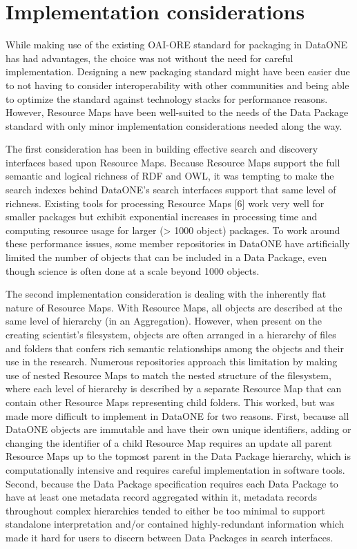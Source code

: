 \documentclass[conference]{IEEEtran}
\begin{document}
\section{Implementation considerations}

While making use of the existing OAI-ORE standard for packaging in DataONE has had advantages, the choice was not without the need for careful implementation. Designing a new packaging standard might have been easier due to not having to consider interoperability with other communities and being able to optimize the standard against technology stacks for performance reasons. However, Resource Maps have been well-suited to the needs of the Data Package standard with only minor implementation considerations needed along the way.

The first consideration has been in building effective search and discovery interfaces based upon Resource Maps. Because Resource Maps support the full semantic and logical richness of RDF and OWL, it was tempting to make the search indexes behind DataONE’s search interfaces support that same level of richness. Existing tools for processing Resource Maps [6] work very well for smaller packages but exhibit exponential increases in processing time and computing resource usage for larger (> 1000 object) packages. To work around these performance issues, some member repositories in DataONE have artificially limited the number of objects that can be included in a Data Package, even though science is often done at a scale beyond 1000 objects.

The second implementation consideration is dealing with the inherently flat nature of Resource Maps. With Resource Maps, all objects are described at the same level of hierarchy (in an Aggregation). However, when present on the creating scientist’s filesystem, objects are often arranged in a hierarchy of files and folders that confers rich semantic relationships among the objects and their use in the research. Numerous repositories approach this limitation by making use of nested Resource Maps to match the nested structure of the filesystem, where each level of hierarchy is described by a separate Resource Map that can contain other Resource Maps representing child folders. This worked, but was made more difficult to implement in DataONE for two reasons. First, because all DataONE objects are immutable and have their own unique identifiers, adding or changing the identifier of a child Resource Map requires an update all parent Resource Maps up to the topmost parent in the Data Package hierarchy, which is computationally intensive and requires careful implementation in software tools. Second, because the Data Package specification requires each Data Package to have at least one metadata record aggregated within it, metadata records throughout complex hierarchies tended to either be too minimal to support standalone interpretation and/or contained highly-redundant information which made it hard for users to discern between Data Packages in search interfaces.
\end{document}
